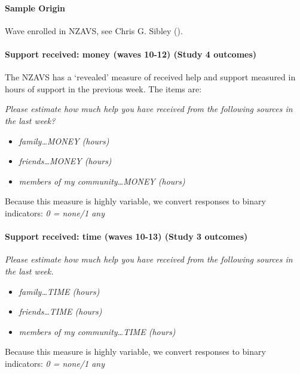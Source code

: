 \documentclass[
  single column]{article}
\let\oldparagraph\paragraph
\renewcommand{\paragraph}[1]{\oldparagraph{#1}\mbox{}}
\providecommand{\tightlist}{%
  \setlength{\itemsep}{0pt}\setlength{\parskip}{0pt}}\usepackage{longtable,booktabs,array}
\begin{document}
\paragraph{Sample Origin}\label{sample-origin}

Wave enrolled in NZAVS, see Chris G. Sibley
().

\paragraph{Support received: money (waves 10-12) (Study 4
outcomes)}\label{support-received-money-waves-10-12-study-4-outcomes}

The NZAVS has a `revealed' measure of received help and support measured
in hours of support in the previous week. The items are:

\emph{Please estimate how much help you have received from the following
sources in the last week?}

\begin{itemize}
\tightlist
\item
  \emph{family\ldots MONEY (hours)}
\item
  \emph{friends\ldots MONEY (hours)}
\item
  \emph{members of my community\ldots MONEY (hours)}
\end{itemize}

Because this measure is highly variable, we convert responses to binary
indicators: \emph{0 = none/1 any}

\paragraph{Support received: time (waves 10-13) (Study 3
outcomes)}\label{support-received-time-waves-10-13-study-3-outcomes}

\emph{Please estimate how much help you have received from the following
sources in the last week.}

\begin{itemize}
\tightlist
\item
  \emph{family\ldots TIME (hours)}
\item
  \emph{friends\ldots TIME (hours)}
\item
  \emph{members of my community\ldots TIME (hours)}
\end{itemize}

Because this measure is highly variable, we convert responses to binary
indicators: \emph{0 = none/1 any}
\end{document}
